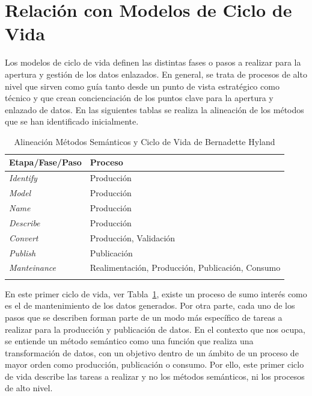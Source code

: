 \section{Relación con Modelos de Ciclo de Vida}
Los modelos de ciclo de vida definen las distintas fases o pasos a realizar para la apertura
y gestión de los datos enlazados. En general, se trata de procesos de alto nivel que sirven como guía tanto desde un punto de vista
estratégico como técnico y que crean concienciación de los puntos clave para la apertura y enlazado de datos. En las siguientes
tablas se realiza la alineación de los métodos que se han identificado inicialmente.
\newpage
\begin{longtable}[c]{|p{6cm}|p{8cm}|} 

\hline

  \textbf{Etapa/Fase/Paso} &  \textbf{Proceso} \\\hline

\endhead
\textit{Identify} & Producción \\ \hline
\textit{Model} & Producción \\ \hline
\textit{Name} & Producción \\ \hline
\textit{Describe} & Producción \\ \hline
\textit{Convert} & Producción, Validación \\ \hline
\textit{Publish} & Publicación \\ \hline
\textit{Manteinance} & Realimentación, Producción, Publicación, Consumo \\ \hline
\hline
\caption{Alineación Métodos Semánticos y Ciclo de Vida de Bernadette Hyland}  \label{tabla:metodos-hyland}\\    
\end{longtable}

En este primer ciclo de vida, ver Tabla~\ref{tabla:metodos-hyland}, existe un proceso de sumo interés como es el 
de mantenimiento de los datos generados. Por otra parte, cada uno de los pasos que se describen forman parte de un modo 
más específico de tareas a realizar para la producción y publicación de datos. En el contexto que nos ocupa, 
se entiende un método semántico como una función que realiza una transformación de datos, con un 
objetivo dentro de un ámbito de un proceso de mayor orden como producción, publicación o consumo. Por ello, este primer ciclo de vida describe las tareas a realizar y no los métodos semánticos, ni los procesos de alto nivel.

